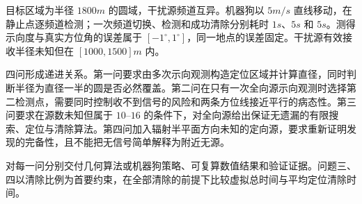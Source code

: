 目标区域为半径 $1800\unit{m}$ 的圆域，干扰源频道互异。机器狗以 $5\unit{m/s}$ 直线移动，在静止点逐频道检测；一次频道切换、检测和成功清除分别耗时 $1\unit{s}$、$5\unit{s}$ 和 $5\unit{s}$。测得示向度与真实方位角的误差属于 $[-1^\circ,1^\circ]$，同一地点的误差固定。干扰源有效接收半径未知但在 $[1000,1500]\unit{m}$ 内。

四问形成递进关系。第一问要求由多次示向观测构造定位区域并计算直径，同时判断半径为直径一半的圆是否必然覆盖。第二问在只有一次全向源示向观测时选择第二检测点，需要同时控制收不到信号的风险和两条方位线接近平行的病态性。第三问要求在源数未知但属于 $10$--$16$ 的条件下，对全向源给出保证无遗漏的有限搜索、定位与清除算法。第四问加入辐射半平面方向未知的定向源，要求重新证明发现的完备性，且不能把无信号简单解释为附近无源。

对每一问分别交付几何算法或机器狗策略、可复算数值结果和验证证据。问题三、四以清除比例为首要约束，在全部清除的前提下比较虚拟总时间与平均定位清除时间。
